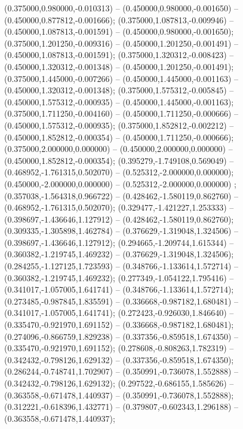 (0.375000,0.980000,-0.010313) -- (0.450000,0.980000,-0.001650) -- (0.450000,0.877812,-0.001666);
 (0.375000,1.087813,-0.009946) -- (0.450000,1.087813,-0.001591) -- (0.450000,0.980000,-0.001650);
 (0.375000,1.201250,-0.009316) -- (0.450000,1.201250,-0.001491) -- (0.450000,1.087813,-0.001591);
 (0.375000,1.320312,-0.008423) -- (0.450000,1.320312,-0.001348) -- (0.450000,1.201250,-0.001491);
 (0.375000,1.445000,-0.007266) -- (0.450000,1.445000,-0.001163) -- (0.450000,1.320312,-0.001348);
 (0.375000,1.575312,-0.005845) -- (0.450000,1.575312,-0.000935) -- (0.450000,1.445000,-0.001163);
 (0.375000,1.711250,-0.004160) -- (0.450000,1.711250,-0.000666) -- (0.450000,1.575312,-0.000935);
 (0.375000,1.852812,-0.002212) -- (0.450000,1.852812,-0.000354) -- (0.450000,1.711250,-0.000666);
 (0.375000,2.000000,0.000000) -- (0.450000,2.000000,0.000000) -- (0.450000,1.852812,-0.000354);
 (0.395279,-1.749108,0.569049) -- (0.468952,-1.761315,0.502070) -- (0.525312,-2.000000,0.000000);
 (0.450000,-2.000000,0.000000) -- (0.525312,-2.000000,0.000000) ;
 (0.357038,-1.564318,0.966722) -- (0.428462,-1.580119,0.862760) -- (0.468952,-1.761315,0.502070);
 (0.329477,-1.421227,1.253333) -- (0.398697,-1.436646,1.127912) -- (0.428462,-1.580119,0.862760);
 (0.309335,-1.305898,1.462784) -- (0.376629,-1.319048,1.324506) -- (0.398697,-1.436646,1.127912);
 (0.294665,-1.209744,1.615344) -- (0.360382,-1.219745,1.469232) -- (0.376629,-1.319048,1.324506);
 (0.284255,-1.127125,1.723593) -- (0.348766,-1.133614,1.572714) -- (0.360382,-1.219745,1.469232);
 (0.277349,-1.054122,1.795416) -- (0.341017,-1.057005,1.641741) -- (0.348766,-1.133614,1.572714);
 (0.273485,-0.987845,1.835591) -- (0.336668,-0.987182,1.680481) -- (0.341017,-1.057005,1.641741);
 (0.272423,-0.926030,1.846640) -- (0.335470,-0.921970,1.691152) -- (0.336668,-0.987182,1.680481);
 (0.274096,-0.866759,1.829238) -- (0.337356,-0.859518,1.674350) -- (0.335470,-0.921970,1.691152);
 (0.278608,-0.808263,1.782319) -- (0.342432,-0.798126,1.629132) -- (0.337356,-0.859518,1.674350);
 (0.286244,-0.748741,1.702907) -- (0.350991,-0.736078,1.552888) -- (0.342432,-0.798126,1.629132);
 (0.297522,-0.686155,1.585626) -- (0.363558,-0.671478,1.440937) -- (0.350991,-0.736078,1.552888);
 (0.312221,-0.618396,1.432771) -- (0.379807,-0.602343,1.296188) -- (0.363558,-0.671478,1.440937);
